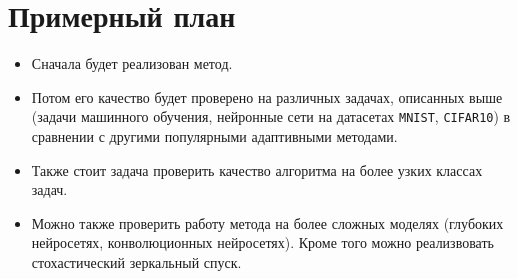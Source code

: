 \documentclass[]{scrartcl}
\begin{document}
\section{Примерный план}
\begin{itemize}
	\item Сначала будет реализован метод.
	\item Потом его качество будет проверено на различных задачах, описанных выше (задачи машинного обучения, нейронные сети на датасетах \texttt{MNIST}, \texttt{CIFAR10}) в сравнении с другими  популярными адаптивными методами.
	\item Также стоит задача проверить качество алгоритма на более узких классах задач.
	\item Можно также проверить работу метода на более сложных моделях (глубоких нейросетях, конволюционных нейросетях). Кроме того можно реализвовать стохастический зеркальный спуск. 
\end{itemize}


\end{document}
